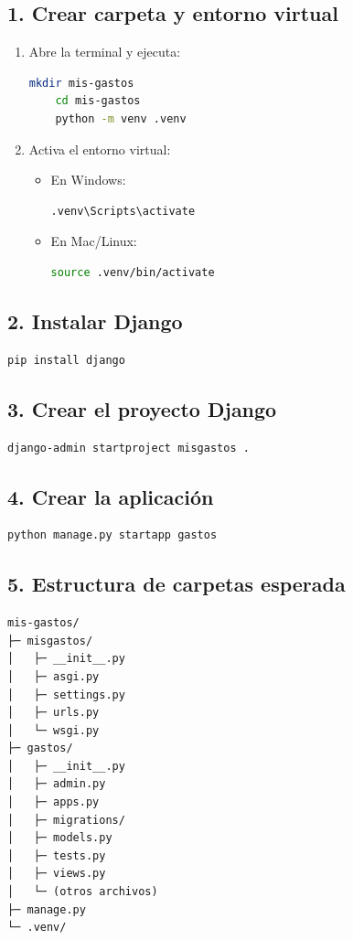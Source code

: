 \documentclass[12pt,a4paper]{article}
\begin{document}
\subsection{1. Crear carpeta y entorno virtual}
\begin{enumerate}
    \item Abre la terminal y ejecuta:
    \begin{lstlisting}[language=bash]
    mkdir mis-gastos
    cd mis-gastos
    python -m venv .venv
    \end{lstlisting}
    \item Activa el entorno virtual:
    \begin{itemize}
        \item En Windows:
        \begin{lstlisting}[language=bash]
        .venv\Scripts\activate
        \end{lstlisting}
        \item En Mac/Linux:
        \begin{lstlisting}[language=bash]
        source .venv/bin/activate
        \end{lstlisting}
    \end{itemize}
\end{enumerate}

\subsection{2. Instalar Django}
\begin{lstlisting}[language=bash]
pip install django
\end{lstlisting}

\subsection{3. Crear el proyecto Django}
\begin{lstlisting}[language=bash]
django-admin startproject misgastos .
\end{lstlisting}

\subsection{4. Crear la aplicación}
\begin{lstlisting}[language=bash]
python manage.py startapp gastos
\end{lstlisting}

\subsection{5. Estructura de carpetas esperada}
\begin{lstlisting}
mis-gastos/
├─ misgastos/
│   ├─ __init__.py
│   ├─ asgi.py
│   ├─ settings.py
│   ├─ urls.py
│   └─ wsgi.py
├─ gastos/
│   ├─ __init__.py
│   ├─ admin.py
│   ├─ apps.py
│   ├─ migrations/
│   ├─ models.py
│   ├─ tests.py
│   ├─ views.py
│   └─ (otros archivos)
├─ manage.py
└─ .venv/
\end{lstlisting}
\end{document}
